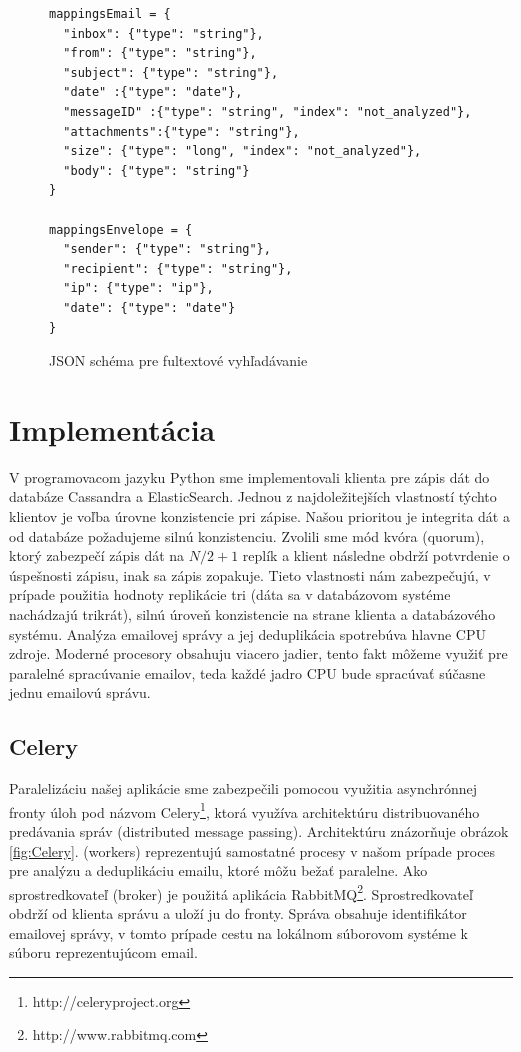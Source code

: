 \documentclass[11pt,twoside,a4paper]{book}
\begin{document}
\begin{figure}[h]
\begin{verbatim}
mappingsEmail = {
  "inbox": {"type": "string"},
  "from": {"type": "string"},
  "subject": {"type": "string"},
  "date" :{"type": "date"},
  "messageID" :{"type": "string", "index": "not_analyzed"},
  "attachments":{"type": "string"},
  "size": {"type": "long", "index": "not_analyzed"},
  "body": {"type": "string"}
}   
            
mappingsEnvelope = {
  "sender": {"type": "string"},
  "recipient": {"type": "string"},
  "ip": {"type": "ip"},
  "date": {"type": "date"}
}     
\end{verbatim}
 \caption{JSON schéma pre fultextové vyhľadávanie}
 \label{fig:ESschema}
\end{figure}      

\newpage

\section{Implementácia}

V programovacom jazyku Python sme implementovali klienta pre zápis dát do databáze Cassandra a ElasticSearch. Jednou z najdoležitejších vlastností týchto klientov je voľba úrovne konzistencie pri zápise. Našou prioritou je integrita dát a od databáze požadujeme silnú konzistenciu. Zvolili sme mód kvóra (quorum), ktorý zabezpečí zápis dát na $N / 2 + 1$ replík a klient následne obdrží potvrdenie o úspešnosti zápisu, inak sa zápis zopakuje. Tieto vlastnosti nám zabezpečujú, v prípade použitia hodnoty replikácie tri (dáta sa v databázovom systéme nachádzajú trikrát), silnú úroveň konzistencie na strane klienta a databázového systému. Analýza emailovej správy a jej deduplikácia spotrebúva hlavne CPU zdroje. Moderné procesory obsahuju viacero jadier, tento fakt môžeme využiť pre paralelné spracúvanie emailov, teda každé jadro CPU bude spracúvať súčasne jednu emailovú správu.

\subsection*{Celery}
Paralelizáciu našej aplikácie sme zabezpečili pomocou využitia asynchrónnej fronty úloh pod názvom Celery\footnote{http://celeryproject.org}, ktorá využíva architektúru distribuovaného predávania správ (distributed message passing). Architektúru znázorňuje obrázok \ref{fig:Celery}.  (workers) reprezentujú samostatné procesy v našom prípade proces pre analýzu a deduplikáciu emailu, ktoré môžu bežať paralelne. Ako sprostredkovateľ (broker) je použitá aplikácia RabbitMQ\footnote{http://www.rabbitmq.com}. Sprostredkovateľ obdrží od klienta správu a uloží ju do fronty. Správa obsahuje identifikátor emailovej správy, v tomto prípade cestu na lokálnom súborovom systéme k súboru reprezentujúcom email.
\end{document}
